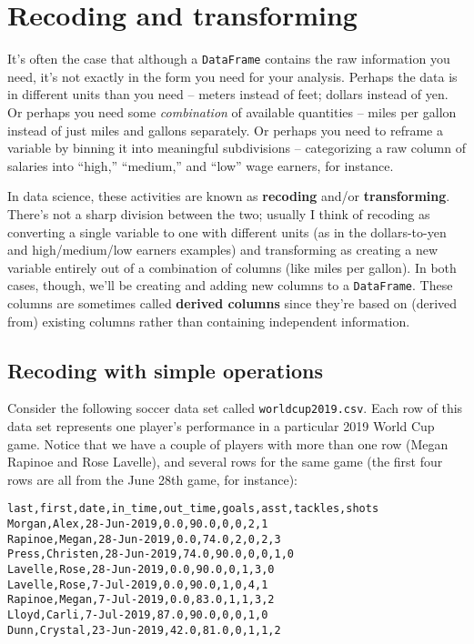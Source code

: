 
\chapter{Recoding and transforming}

It's often the case that although a \texttt{DataFrame} contains the raw
information you need, it's not exactly in the form you need for your analysis.
Perhaps the data is in different units than you need -- meters instead of feet;
dollars instead of yen. Or perhaps you need some \textit{combination} of
available quantities -- miles per gallon instead of just miles and gallons
separately. Or perhaps you need to reframe a variable by binning it into
meaningful subdivisions -- categorizing a raw column of salaries into ``high,''
``medium,'' and ``low'' wage earners, for instance.


In data science, these activities are known as \textbf{recoding} and/or
\textbf{transforming}. There's not a sharp division between the two; usually I
think of recoding as converting a single variable to one with different units
(as in the dollars-to-yen and high/medium/low earners examples) and
transforming as creating a new variable entirely out of a combination of
columns (like miles per gallon). In both cases, though, we'll be creating and
adding new columns to a \texttt{DataFrame}. These columns are sometimes called
\textbf{derived columns} since they're based on (derived from) existing columns
rather than containing independent information.

\section{Recoding with simple operations}


Consider the following soccer data set called \texttt{worldcup2019.csv}.
Each row of this data set represents one player's performance in a particular
2019 World Cup game. Notice that we have a couple of players with more than one
row (Megan Rapinoe and Rose Lavelle), and several rows for the same game (the
first four rows are all from the June 28th game, for instance):

\begin{Verbatim}[fontsize=\small,samepage=true,frame=lines,framesep=3mm]
last,first,date,in_time,out_time,goals,asst,tackles,shots
Morgan,Alex,28-Jun-2019,0.0,90.0,0,0,2,1
Rapinoe,Megan,28-Jun-2019,0.0,74.0,2,0,2,3
Press,Christen,28-Jun-2019,74.0,90.0,0,0,1,0
Lavelle,Rose,28-Jun-2019,0.0,90.0,0,1,3,0
Lavelle,Rose,7-Jul-2019,0.0,90.0,1,0,4,1
Rapinoe,Megan,7-Jul-2019,0.0,83.0,1,1,3,2
Lloyd,Carli,7-Jul-2019,87.0,90.0,0,0,1,0
Dunn,Crystal,23-Jun-2019,42.0,81.0,0,1,1,2
\end{Verbatim}

